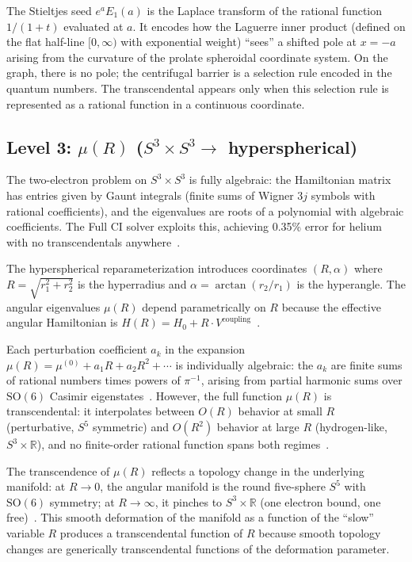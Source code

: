 \documentclass[aps,pra,twocolumn,superscriptaddress,longbibliography]{revtex4-2}
\begin{document}
The Stieltjes seed $e^a E_1(a)$ is the Laplace transform of the
rational function $1/(1+t)$ evaluated at $a$.  It encodes how
the Laguerre inner product (defined on the flat half-line
$[0, \infty)$ with exponential weight) ``sees'' a shifted pole
at $x = -a$ arising from the curvature of the prolate spheroidal
coordinate system.  On the graph, there is no pole; the
centrifugal barrier is a selection rule encoded in the quantum
numbers.  The transcendental appears only when this selection
rule is represented as a rational function in a continuous
coordinate.

\subsection{Level 3: $\mu(R)$ ($S^3 \times S^3 \to$ hyperspherical)}
\label{sec:mu}

The two-electron problem on $S^3 \times S^3$ is fully algebraic:
the Hamiltonian matrix has entries given by Gaunt integrals
(finite sums of Wigner $3j$ symbols with rational coefficients),
and the eigenvalues are roots of a polynomial with algebraic
coefficients.  The Full CI solver exploits this, achieving
0.35\% error for helium with no transcendentals
anywhere~\cite{loutey_fci}.

The hyperspherical reparameterization introduces coordinates
$(R, \alpha)$ where $R = \sqrt{r_1^2 + r_2^2}$ is the
hyperradius and $\alpha = \arctan(r_2/r_1)$ is the hyperangle.
The angular eigenvalues $\mu(R)$ depend parametrically on $R$
because the effective angular Hamiltonian is
$H(R) = H_0 + R \cdot V^{\mathrm{coupling}}$~\cite{loutey_paper13}.

Each perturbation coefficient $a_k$ in the expansion
$\mu(R) = \mu^{(0)} + a_1 R + a_2 R^2 + \cdots$ is individually
algebraic: the $a_k$ are finite sums of rational numbers times
powers of $\pi^{-1}$, arising from partial harmonic sums over
$\mathrm{SO}(6)$ Casimir eigenstates~\cite{loutey_paper13}.
However, the full function $\mu(R)$ is transcendental: it
interpolates between $O(R)$ behavior at small $R$ (perturbative,
$S^5$ symmetric) and $O(R^2)$ behavior at large $R$
(hydrogen-like, $S^3 \times \mathbb{R}$), and no finite-order
rational function spans both
regimes~\cite{loutey_paper13,loutey_track_g}.

The transcendence of $\mu(R)$ reflects a topology change in
the underlying manifold: at $R \to 0$, the angular manifold
is the round five-sphere $S^5$ with $\mathrm{SO}(6)$ symmetry;
at $R \to \infty$, it pinches to $S^3 \times \mathbb{R}$
(one electron bound, one free)~\cite{loutey_paper13}.  This
smooth deformation of the manifold as a function of the
``slow'' variable $R$ produces a transcendental function of
$R$ because smooth topology changes are generically
transcendental functions of the deformation parameter.
\end{document}
